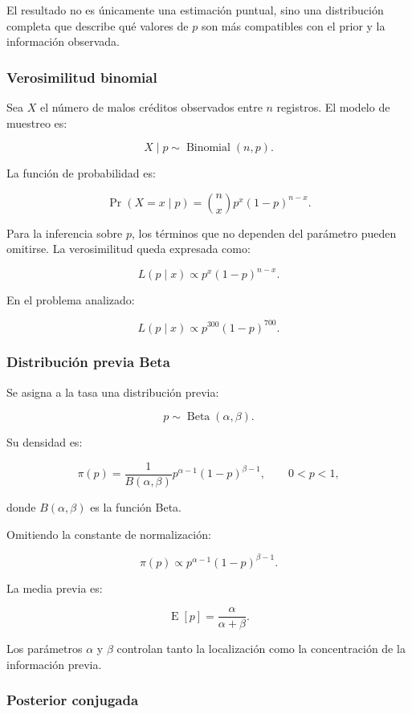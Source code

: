 El resultado no es únicamente una estimación puntual, sino una
distribución completa que describe qué valores de \(p\) son más
compatibles con el prior y la información observada.

\subsubsection{Verosimilitud binomial}

Sea \(X\) el número de malos créditos observados entre \(n\) registros.
El modelo de muestreo es:

\[
X\mid p
\sim
\operatorname{Binomial}(n,p).
\]

La función de probabilidad es:

\[
\Pr(X=x\mid p)
=
\binom{n}{x}
p^x(1-p)^{n-x}.
\]

Para la inferencia sobre \(p\), los términos que no dependen del
parámetro pueden omitirse. La verosimilitud queda expresada como:

\[
L(p\mid x)
\propto
p^x(1-p)^{n-x}.
\]

En el problema analizado:

\[
L(p\mid x)
\propto
p^{300}(1-p)^{700}.
\]

\subsubsection{Distribución previa Beta}

Se asigna a la tasa una distribución previa:

\[
p
\sim
\operatorname{Beta}(\alpha,\beta).
\]

Su densidad es:

\[
\pi(p)
=
\frac{
    1
}{
    B(\alpha,\beta)
}
p^{\alpha-1}
(1-p)^{\beta-1},
\qquad
0<p<1,
\]

donde \(B(\alpha,\beta)\) es la función Beta.

Omitiendo la constante de normalización:

\[
\pi(p)
\propto
p^{\alpha-1}
(1-p)^{\beta-1}.
\]

La media previa es:

\[
\operatorname{E}[p]
=
\frac{\alpha}{\alpha+\beta}.
\]

Los parámetros \(\alpha\) y \(\beta\) controlan tanto la localización como
la concentración de la información previa.

\subsubsection{Posterior conjugada}

